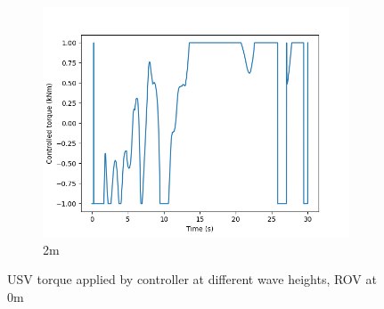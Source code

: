 \documentclass[class=article, crop=false]{standalone}
\begin{document}
\begin{figure}
\begin{subfigure}[b]{0.48\textwidth}
        \includegraphics{scenario1/rov-0m/2.0m/usv_torque}
        \caption{2m}
        \label{}
    \end{subfigure}

    \caption{USV torque applied by controller at different wave heights, ROV at 0m}
\end{figure}
\end{document}
